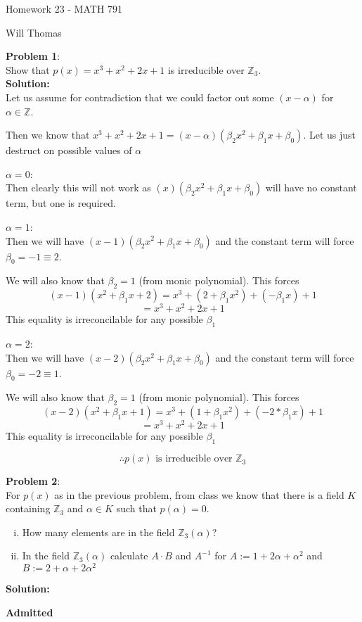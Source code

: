\documentclass[11pt]{article}
\newcommand{\prob}[3]{\begin{flushleft}
        \textbf{Problem #1}: \\
        #2 
		\textbf{Solution:} 
		#3

\end{flushleft}}
\newcommand{\admit}{
  \begin{flushright}
    \textbf{Admitted}
  \end{flushright}
}
\newcommand{\makeHWtitle}[1]{
    \begin{center}
    \Large{Homework #1 - MATH 791} 
        \vspace{5pt}
        
        \normalsize{Will Thomas}
        \vspace{5pt}
    \end{center}
}
\begin{document}
\makeHWtitle{23}

\prob{1}{
  Show that $p(x) = x^3 + x^2 + 2x + 1$ is irreducible over $\mathbb{Z}_3$. \\
}{ \\
  Let us assume for contradiction that we could factor out some $(x - \alpha)$ for $\alpha \in \mathbb{Z}$.

  Then we know that $x^3 + x^2 + 2x + 1 = (x - \alpha)(\beta_2 x^2 + \beta_1 x + \beta_0)$.
  Let us just destruct on possible values of $\alpha$

  \textbf{$\alpha = 0$}: \\
  Then clearly this will not work as $(x)(\beta_2 x^2 + \beta_1 x + \beta_0)$ will have no constant term, but one is required.

  \textbf{$\alpha = 1$}: \\
  Then we will have $(x - 1)(\beta_2 x^2 + \beta_1 x + \beta_0)$
  and the constant term will force $\beta_0 = -1 \equiv 2$.

  We will also know that $\beta_2 = 1$ (from monic polynomial).
  This forces
  $$(x - 1)(x^2 + \beta_1 x + 2) = x^3 + (2 + \beta_1 x^2) + (-\beta_1 x) + 1$$
  $$= x^3 + x^2 + 2x + 1$$
  This equality is irreconcilable for any possible $\beta_1$

  \textbf{$\alpha = 2$}: \\
  Then we will have $(x - 2)(\beta_2 x^2 + \beta_1 x + \beta_0)$
  and the constant term will force $\beta_0 = -2 \equiv 1$.


  We will also know that $\beta_2 = 1$ (from monic polynomial).
  This forces
  $$(x - 2)(x^2 + \beta_1 x + 1) = x^3 + (1 + \beta_1 x^2) + (-2*\beta_1 x) + 1$$
  $$= x^3 + x^2 + 2x + 1$$
  This equality is irreconcilable for any possible $\beta_1$

  $$\therefore \text{$p(x)$ is irreducible over $\mathbb{Z}_3$}$$
}

\prob{2}{
  For $p(x)$ as in the previous problem, from class we know that there is a field $K$ containing $\mathbb{Z}_3$ and $\alpha \in K$ such that $p(\alpha) = 0$.
  \begin{enumerate}[(i)]
    \item How many elements are in the field $\mathbb{Z}_3(\alpha)$?
    \item In the field $\mathbb{Z}_3(\alpha)$ calculate $A \cdot B$ and $A^{-1}$ for
          $A := 1 + 2 \alpha + \alpha^2$ and $B := 2 + \alpha + 2 \alpha^2$
  \end{enumerate}
}{ \\
  \admit
}
\end{document}
